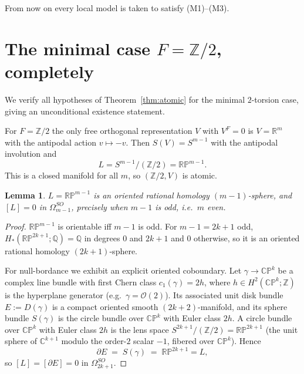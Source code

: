 \documentclass[12pt]{article}
\newtheorem{lemma}[theorem]{Lemma}
\theoremstyle{definition}
\begin{document}
From now on every local model is taken to satisfy {\rm(M1)--(M3)}.
\section{The minimal case $F=\mathbb{Z}/2$, completely}\label{sec:Z2}

We verify all hypotheses of Theorem~\ref{thm:atomic} for the minimal
$2$-torsion case, giving an unconditional existence statement.

For $F=\mathbb{Z}/2$ the only free orthogonal representation $V$ with $V^F=0$ is
$V=\mathbb{R}^{m}$ with the antipodal action $v\mapsto-v$. Then $S(V)=S^{m-1}$
with the antipodal involution and
\[
   L=S^{m-1}/(\mathbb{Z}/2)=\mathbb{RP}^{m-1}.
\]
This is a closed manifold for all $m$, so $(\mathbb{Z}/2,V)$ is atomic.

\begin{lemma}\label{lem:RPodd}
$L=\mathbb{RP}^{m-1}$ is an oriented rational homology $(m-1)$-sphere, and
$[L]=0$ in $\Omega^{SO}_{m-1}$, precisely when $m-1$ is odd, i.e.\ $m$ even.
\end{lemma}
\begin{proof}
$\mathbb{RP}^{m-1}$ is orientable iff $m-1$ is odd. For $m-1=2k+1$ odd,
$H_*(\mathbb{RP}^{2k+1};\mathbb{Q})=\mathbb{Q}$ in degrees $0$ and $2k+1$ and $0$
otherwise, so it is an oriented rational homology $(2k+1)$-sphere.

For null-bordance we exhibit an explicit oriented coboundary. Let
$\gamma\to\mathbb{CP}^k$ be a complex line bundle with first Chern class
$c_1(\gamma)=2h$, where $h\in H^2(\mathbb{CP}^k;\mathbb{Z})$ is the hyperplane
generator (e.g.\ $\gamma=\mathcal{O}(2)$). Its associated unit disk bundle
$E:=D(\gamma)$ is a compact oriented smooth $(2k+2)$-manifold, and its sphere
bundle $S(\gamma)$ is the circle bundle over $\mathbb{CP}^k$ with Euler class
$2h$. A circle bundle over $\mathbb{CP}^k$ with Euler class $2h$ is the lens
space $S^{2k+1}/(\mathbb{Z}/2)=\mathbb{RP}^{2k+1}$ (the unit sphere of
$\mathbb{C}^{k+1}$ modulo the order-$2$ scalar $-1$, fibered over
$\mathbb{CP}^k$). Hence
\[
  \partial E \;=\; S(\gamma)\;=\;\mathbb{RP}^{2k+1}=L,
\]
so $[L]=[\partial E]=0$ in $\Omega^{SO}_{2k+1}$.
\end{proof}
\end{document}
